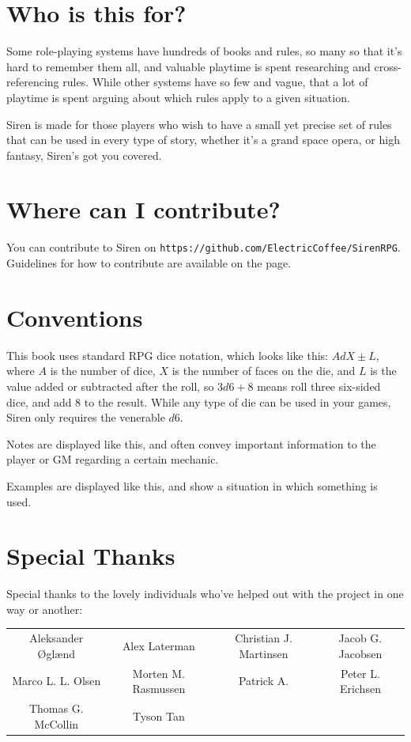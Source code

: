 \documentclass[a4paper]{book}
\begin{document}
\section*{Who is this for?}
Some role-playing systems have hundreds of books and rules, so many so that it's hard to remember them all, and valuable playtime is spent researching and cross-referencing rules. 
While other systems have so few and vague, that a lot of playtime is spent arguing about which rules apply to a given situation.

Siren is made for those players who wish to have a small yet precise set of rules that can be used in every type of story, whether it's a grand space opera, or high fantasy, Siren's got you covered.

\section*{Where can I contribute?}
You can contribute to Siren on \texttt{https://github.com/ElectricCoffee/SirenRPG}.
Guidelines for how to contribute are available on the page.

\section*{Conventions}
This book uses standard RPG dice notation, which looks like this: $AdX\pm L$, where $A$ is the number of dice, $X$ is the number of faces on the die, and $L$ is the value added or subtracted after the roll, so $3d6+8$ means roll three six-sided dice, and add 8 to the result.
While any type of die can be used in your games, Siren only requires the venerable $d6$.

\begin{note}
  Notes are displayed like this, and often convey important information to the player or GM regarding a certain mechanic.
\end{note}

\begin{example}
  Examples are displayed like this, and show a situation in which something is used.
\end{example}

\section*{Special Thanks}
Special thanks to the lovely individuals who've helped out with the project in one way or another:
\begin{center}
    \begin{tabular}{cccc}
        Aleksander Øglænd & Alex Laterman & Christian J. Martinsen & Jacob G. Jacobsen \\
        Marco L. L. Olsen & Morten M. Rasmussen & Patrick A. & Peter L. Erichsen \\ Thomas G. McCollin & Tyson Tan \\
    \end{tabular}
\end{center}
\end{document}
